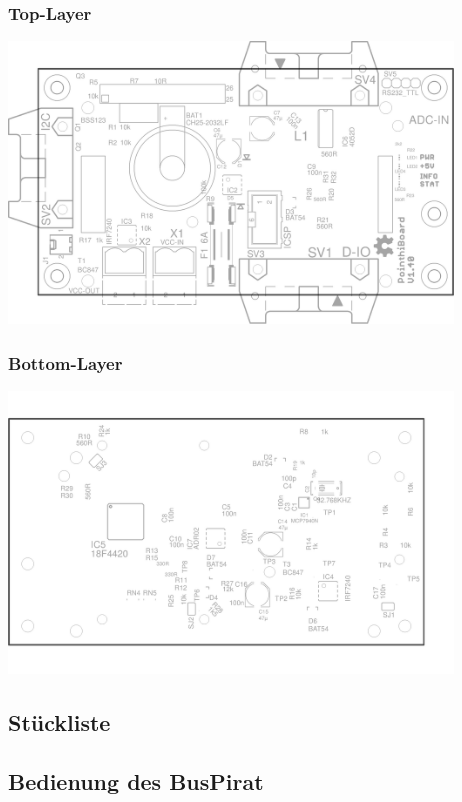 \documentclass[a4paper,10pt]{article}
\begin{document}
\subsubsection{Top-Layer}

\includegraphics[width=118mm]{board_parts_top} \\

\subsubsection{Bottom-Layer}

\includegraphics[width=118mm]{board_parts_bottom} \\

\newpage
\subsection{Stückliste}



\newpage
\subsection{Bedienung des BusPirat}
\end{document}
